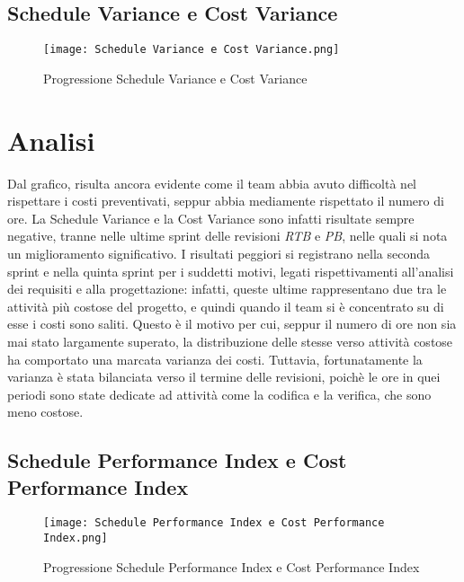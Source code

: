 \subsection{Schedule Variance e Cost Variance}
\label{subsec:Schedule Variance e Cost Variance}

\begin{figure}[h] 
    \centering
    \texttt{[image: Schedule Variance e Cost Variance.png]}
    \caption{Progressione Schedule Variance e Cost Variance} 
    \label{fig: Schedule Variance e Cost Variance}
\end{figure}

\section*{Analisi}

Dal grafico, risulta ancora evidente come il team abbia avuto difficoltà nel
rispettare i costi preventivati, seppur abbia mediamente rispettato il numero di ore. La Schedule Variance e la Cost Variance sono infatti
risultate sempre negative, tranne nelle ultime sprint delle revisioni \emph{RTB} e \emph{PB}, nelle quali si nota un miglioramento
significativo. I risultati peggiori si registrano nella seconda sprint e nella quinta sprint per i suddetti
motivi, legati rispettivamenti all'analisi dei requisiti e alla progettazione: infatti, queste ultime rappresentano due tra le attività più costose del progetto, e quindi quando il team si è concentrato su di esse i costi sono saliti. Questo è il motivo per cui, seppur il numero di ore non sia mai stato largamente superato, la distribuzione delle stesse verso attività costose ha comportato una marcata varianza dei costi. Tuttavia, fortunatamente la varianza è stata bilanciata verso il termine delle revisioni, poichè le ore in quei periodi sono state dedicate ad attività come la codifica e la verifica, che sono meno costose.

\newpage

\subsection{Schedule Performance Index e Cost Performance Index}
\label{subsec:Schedule Performance Index e Cost Performance Index}

\begin{figure}[h] 
    \centering
    \texttt{[image: Schedule Performance Index e Cost Performance Index.png]}
    \caption{Progressione Schedule Performance Index e Cost Performance Index} 
    \label{fig: Schedule Performance Index e Cost Performance Index}
\end{figure}

